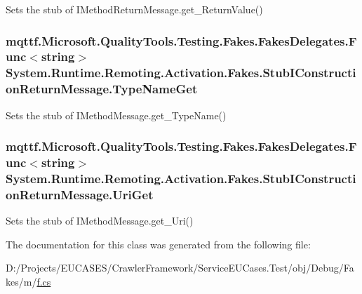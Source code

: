 Sets the stub of I\-Method\-Return\-Message.\-get\-\_\-\-Return\-Value()

\hypertarget{class_system_1_1_runtime_1_1_remoting_1_1_activation_1_1_fakes_1_1_stub_i_construction_return_message_a6b361a82d827a84cc2dbcc5007cd553e}{
\subsubsection[{Type\-Name\-Get}]{\setlength{\rightskip}{0pt plus 5cm}mqttf.\-Microsoft.\-Quality\-Tools.\-Testing.\-Fakes.\-Fakes\-Delegates.\-Func$<$string$>$ System.\-Runtime.\-Remoting.\-Activation.\-Fakes.\-Stub\-I\-Construction\-Return\-Message.\-Type\-Name\-Get}}\label{class_system_1_1_runtime_1_1_remoting_1_1_activation_1_1_fakes_1_1_stub_i_construction_return_message_a6b361a82d827a84cc2dbcc5007cd553e}


Sets the stub of I\-Method\-Message.\-get\-\_\-\-Type\-Name()

\hypertarget{class_system_1_1_runtime_1_1_remoting_1_1_activation_1_1_fakes_1_1_stub_i_construction_return_message_aebe2c5c8767def9a7b6b8a9c9eaea56c}{
\subsubsection[{Uri\-Get}]{\setlength{\rightskip}{0pt plus 5cm}mqttf.\-Microsoft.\-Quality\-Tools.\-Testing.\-Fakes.\-Fakes\-Delegates.\-Func$<$string$>$ System.\-Runtime.\-Remoting.\-Activation.\-Fakes.\-Stub\-I\-Construction\-Return\-Message.\-Uri\-Get}}\label{class_system_1_1_runtime_1_1_remoting_1_1_activation_1_1_fakes_1_1_stub_i_construction_return_message_aebe2c5c8767def9a7b6b8a9c9eaea56c}


Sets the stub of I\-Method\-Message.\-get\-\_\-\-Uri()



The documentation for this class was generated from the following file\-:\begin{DoxyCompactItemize}
\item 
D\-:/\-Projects/\-E\-U\-C\-A\-S\-E\-S/\-Crawler\-Framework/\-Service\-E\-U\-Cases.\-Test/obj/\-Debug/\-Fakes/m/\hyperlink{m_2f_8cs}{f.\-cs}\end{DoxyCompactItemize}
